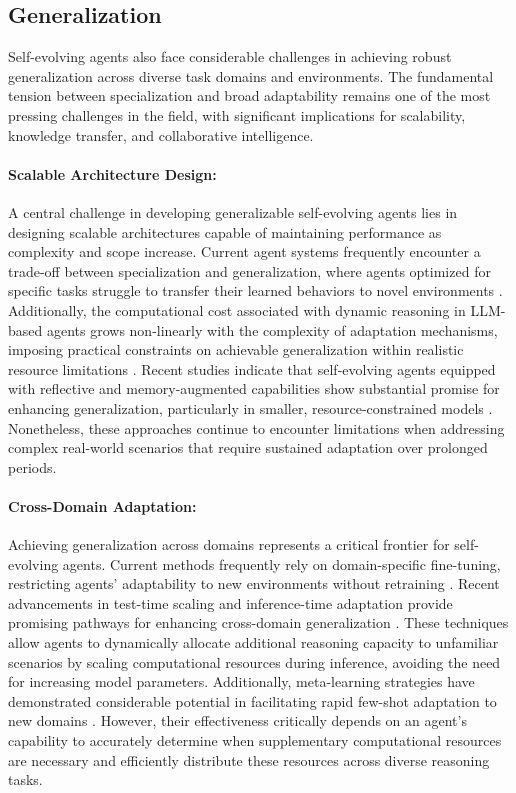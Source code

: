 \documentclass[10pt]{article} %
\begin{document}
\subsection{Generalization}

Self-evolving agents also face considerable challenges in achieving robust generalization across diverse task domains and environments. The fundamental tension between specialization and broad adaptability remains one of the most pressing challenges in the field, with significant implications for scalability, knowledge transfer, and collaborative intelligence.

\paragraph{Scalable Architecture Design:} A central challenge in developing generalizable self-evolving agents lies in designing scalable architectures capable of maintaining performance as complexity and scope increase. Current agent systems frequently encounter a trade-off between specialization and generalization, where agents optimized for specific tasks struggle to transfer their learned behaviors to novel environments \citep{chen2024optima}. Additionally, the computational cost associated with dynamic reasoning in LLM-based agents grows non-linearly with the complexity of adaptation mechanisms, imposing practical constraints on achievable generalization within realistic resource limitations \citep{kim2025cost}. Recent studies indicate that self-evolving agents equipped with reflective and memory-augmented capabilities show substantial promise for enhancing generalization, particularly in smaller, resource-constrained models \citep{liang2024sage}. Nonetheless, these approaches continue to encounter limitations when addressing complex real-world scenarios that require sustained adaptation over prolonged periods.



\paragraph{Cross-Domain Adaptation:} Achieving generalization across domains represents a critical frontier for self-evolving agents. Current methods frequently rely on domain-specific fine-tuning, restricting agents' adaptability to new environments without retraining \citep{belle2025agents}. Recent advancements in test-time scaling and inference-time adaptation provide promising pathways for enhancing cross-domain generalization \citep{snell2024scaling, zhang2025survey}. These techniques allow agents to dynamically allocate additional reasoning capacity to unfamiliar scenarios by scaling computational resources during inference, avoiding the need for increasing model parameters. Additionally, meta-learning strategies have demonstrated considerable potential in facilitating rapid few-shot adaptation to new domains \citep{bilal2025meta}. However, their effectiveness critically depends on an agent's capability to accurately determine when supplementary computational resources are necessary and efficiently distribute these resources across diverse reasoning tasks.
\end{document}
